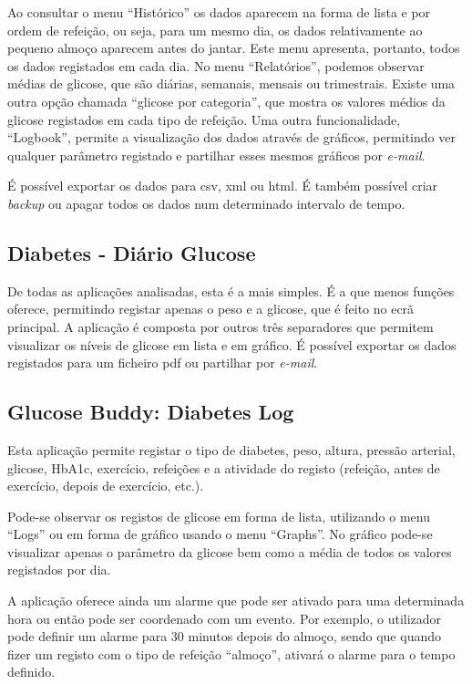 Ao consultar o menu ``Histórico'' os dados aparecem na forma de lista e por ordem de refeição, ou seja, para um mesmo dia, os dados relativamente ao pequeno almoço aparecem antes do jantar. Este menu apresenta, portanto, todos os dados registados em cada dia. 
No menu ``Relatórios'', podemos observar médias de glicose, que são diárias, semanais, mensais ou trimestrais. Existe uma outra opção chamada ``glicose por categoria'', que mostra os valores médios da glicose registados em cada tipo de refeição.
Uma outra funcionalidade, ``Logbook'', permite a visualização dos dados através de gráficos, permitindo ver qualquer parâmetro registado e partilhar esses mesmos gráficos por \textit{e-mail}.

É possível exportar os dados para csv, xml ou html. É também possível criar \textit{backup} ou apagar todos os dados num determinado intervalo de tempo.

\subsection{Diabetes - Diário Glucose}

De todas as aplicações analisadas, esta é a mais simples. É a que menos funções oferece, permitindo registar apenas o peso e a glicose, que é feito no ecrã principal. A aplicação é composta por outros três separadores que permitem visualizar os níveis de glicose em lista e em gráfico. É possível exportar os dados registados para um ficheiro pdf ou partilhar por \textit{e-mail}.

\subsection{Glucose Buddy: Diabetes Log}

Esta aplicação permite registar o tipo de diabetes, peso, altura, pressão arterial, glicose, HbA1c, exercício, refeições e a atividade do registo (refeição, antes de exercício, depois de exercício, etc.).

Pode-se observar os registos de glicose em forma de lista, utilizando o menu ``Logs'' ou em forma de gráfico usando o menu ``Graphs''. No gráfico pode-se visualizar apenas o parâmetro da glicose bem como a média de todos os valores registados por dia.

A aplicação oferece ainda um alarme que pode ser ativado para uma determinada hora ou então pode ser coordenado com um evento. Por exemplo, o utilizador pode definir um alarme para 30 minutos depois do almoço, sendo que quando fizer um registo com o tipo de refeição ``almoço'', ativará o alarme para o tempo definido. 

